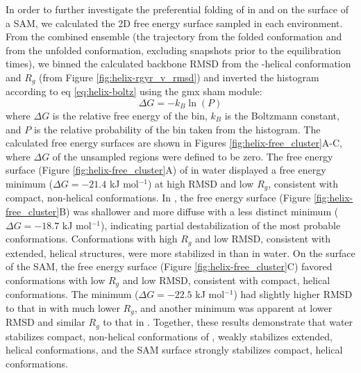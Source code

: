 In order to further investigate the preferential folding of \pep{} in \tbawat{} and on the surface of a SAM, we calculated the 2D free energy surface sampled in each environment. 
From the combined ensemble (the trajectory from the folded conformation and from the unfolded conformation, excluding snapshots prior to the equilibration times), we binned the calculated backbone RMSD from the \textalpha{}-helical conformation and $R_g$ (from Figure \ref{fig:helix-rgyr_v_rmsd}) and inverted the histogram according to eq \ref{eq:helix-boltz} using the gmx sham module:
\begin{equation}
    \Delta G = -k_B \ln(P)
    \label{eq:helix-boltz}
\end{equation}
where $\Delta G$ is the relative free energy of the bin, $k_B$ is the Boltzmann constant, and $P$ is the relative probability of the bin taken from the histogram. 
The calculated free energy surfaces are shown in Figures \ref{fig:helix-free_cluster}A-C, where $\Delta G$ of the unsampled regions were defined to be zero. 
The free energy surface (Figure \ref{fig:helix-free_cluster}A) of \pep{} in water displayed a free energy minimum ($\Delta G = -21.4$ kJ mol$^{-1}$) at high RMSD and low $R_g$, consistent with compact, non-helical conformations. 
In \tbawat{}, the free energy surface (Figure \ref{fig:helix-free_cluster}B) was shallower and more diffuse with a less distinct minimum ($\Delta G = -18.7$ kJ mol$^{-1}$), indicating partial destabilization of the most probable conformations. 
Conformations with high $R_g$ and low RMSD, consistent with extended, helical structures, were more stabilized in \tbawat{} than in water. 
On the surface of the SAM, the free energy surface (Figure \ref{fig:helix-free_cluster}C) favored conformations with low $R_g$ and low RMSD, consistent with compact, helical conformations. 
The minimum ($\Delta G = -22.5$ kJ mol$^{-1}$) had slightly higher RMSD to that in \tbawat{} with much lower $R_g$, and another minimum was apparent at lower RMSD and similar $R_g$ to that in \tbawat{}. 
Together, these results demonstrate that water stabilizes compact, non-helical conformations of \pep{}, \tbawat{} weakly stabilizes extended, helical conformations, and the SAM surface strongly stabilizes compact, helical conformations.

